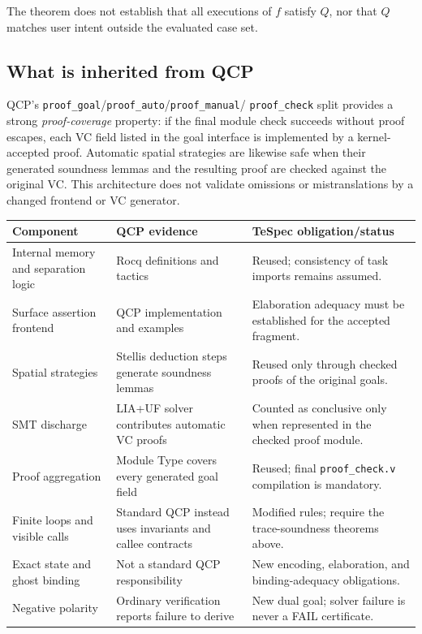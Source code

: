 \documentclass[10pt]{article}
\newcommand{\fail}{\textsf{FAIL}}
\begin{document}
The theorem does not establish that all executions of $f$ satisfy $Q$, nor that
$Q$ matches user intent outside the evaluated case set.

\subsection{What is inherited from QCP}

QCP's \texttt{proof\_goal}/\texttt{proof\_auto}/\texttt{proof\_manual}/
\texttt{proof\_check} split provides a strong \emph{proof-coverage} property:
if the final module check succeeds without proof escapes, each VC field listed
in the goal interface is implemented by a kernel-accepted proof.  Automatic
spatial strategies are likewise safe when their generated soundness lemmas and
the resulting proof are checked against the original VC.  This architecture
does not validate omissions or mistranslations by a changed frontend or VC
generator.

\begin{center}
\small
\begin{tabular}{p{.22\linewidth}p{.27\linewidth}p{.39\linewidth}}
\toprule
Component & QCP evidence & TeSpec obligation/status\\
\midrule
Internal memory and separation logic
  & Rocq definitions and tactics
  & Reused; consistency of task imports remains assumed.\\
Surface assertion frontend
  & QCP implementation and examples
  & Elaboration adequacy must be established for the accepted fragment.\\
Spatial strategies
  & Stellis deduction steps generate soundness lemmas
  & Reused only through checked proofs of the original goals.\\
SMT discharge
  & LIA+UF solver contributes automatic VC proofs
  & Counted as conclusive only when represented in the checked proof module.\\
Proof aggregation
  & Module Type covers every generated goal field
  & Reused; final \texttt{proof\_check.v} compilation is mandatory.\\
Finite loops and visible calls
  & Standard QCP instead uses invariants and callee contracts
  & Modified rules; require the trace-soundness theorems above.\\
Exact state and ghost binding
  & Not a standard QCP responsibility
  & New encoding, elaboration, and binding-adequacy obligations.\\
Negative polarity
  & Ordinary verification reports failure to derive
  & New dual goal; solver failure is never a \fail{} certificate.\\
\bottomrule
\end{tabular}
\end{center}
\end{document}

